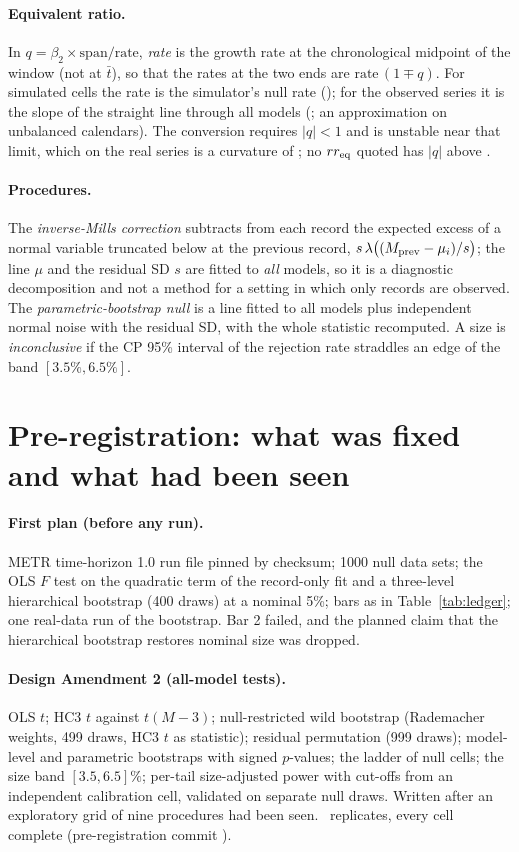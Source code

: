 \documentclass[aps,pre,twocolumn,superscriptaddress,nofootinbib,9pt]{revtex4-2}
\newcommand{\rreq}{rr_{\rm eq}}
\begin{document}
\paragraph*{Equivalent ratio.} In $q=\beta_2\times\text{span}/\text{rate}$, \emph{rate} is the growth rate at the chronological midpoint of the window (not at $\bar t$), so that the rates at the two ends are $\text{rate}\,(1\mp q)$. For simulated cells the rate is the simulator's null rate (\rateNull); for the observed series it is the slope of the straight line through all models (\linSlope; an approximation on unbalanced calendars). The conversion requires $|q|<1$ and is unstable near that limit, which on the real series is a curvature of \rrEqPole; no $\rreq$ quoted has $|q|$ above \rrEqMaxQ.

\paragraph*{Procedures.} The \emph{inverse-Mills correction} subtracts from each record the expected excess of a normal variable truncated below at the previous record, $s\,\lambda\big((M_{\rm prev}-\mu_i)/s\big)$; the line $\mu$ and the residual SD $s$ are fitted to \emph{all} models, so it is a diagnostic decomposition and not a method for a setting in which only records are observed. The \emph{parametric-bootstrap null} is a line fitted to all models plus independent normal noise with the residual SD, with the whole statistic recomputed. A size is \emph{inconclusive} if the CP 95\% interval of the rejection rate straddles an edge of the band $[3.5\%,6.5\%]$.

\section{Pre-registration: what was fixed and what had been seen}\label{sup:prereg}
\paragraph*{First plan (before any run).} METR time-horizon 1.0 run file pinned by checksum; 1000 null data sets; the OLS $F$ test on the quadratic term of the record-only fit and a three-level hierarchical bootstrap (400 draws) at a nominal 5\%; bars as in Table~\ref{tab:ledger}; one real-data run of the bootstrap. Bar 2 failed, and the planned claim that the hierarchical bootstrap restores nominal size was dropped.

\paragraph*{Design Amendment 2 (all-model tests).} OLS $t$; HC3 $t$ against $t(M-3)$; null-restricted wild bootstrap (Rademacher weights, 499 draws, HC3 $t$ as statistic); residual permutation (999 draws); model-level and parametric bootstraps with signed $p$-values; the ladder of null cells; the size band $[3.5,6.5]\%$; per-tail size-adjusted power with cut-offs from an independent calibration cell, validated on separate null draws. Written after an exploratory grid of nine procedures had been seen. \aTwoReps\ replicates, every cell complete (pre-registration commit \preregATwo).
\end{document}
